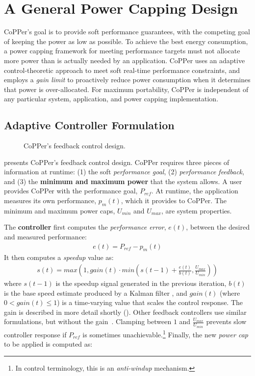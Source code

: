 \section{A General Power Capping Design}
\label{sec:copper-framework}

CoPPer's goal is to provide soft performance guarantees, with the competing goal of keeping the power as low as possible.
To achieve the best energy consumption, a power capping framework for meeting performance targets must not allocate more power than is actually needed by an application.
CoPPer uses an adaptive control-theoretic approach to meet soft real-time performance constraints, and employs a \emph{gain limit} to proactively reduce power consumption when it determines that power is over-allocated.
For maximum portability, CoPPer is independent of any particular system, application, and power capping implementation.


\subsection{Adaptive Controller Formulation}

\begin{figure}[t]
  \centering
  
  \caption{CoPPer's feedback control design.}
  \label{fig:copper-runtime}
\end{figure}

 presents CoPPer's feedback control design.
CoPPer requires three pieces of information at runtime: (1) the soft \emph{performance goal}, (2) \emph{performance feedback}, and (3) the \textbf{minimum and maximum power} that the system allows.
A user provides CoPPer with the performance goal, $P_{ref}$.
At runtime, the application measures its own performance, $p_m(t)$, which it provides to CoPPer.
The minimum and maximum power caps, $U_{min}$ and $U_{max}$, are system properties.

The \textbf{controller} first computes the \emph{performance error}, $e(t)$, between the desired and measured performance:
\begin{eqnarray}
  e(t) = P_{ref} - p_m(t)
  \label{eqn:copper-error}
\end{eqnarray}
It then computes a \emph{speedup} value as:
\begin{eqnarray}
  s(t) = max\left(1, gain(t) \cdot min\left(s(t-1) + \frac{e(t)}{b(t)}, \frac{U_{max}}{U_{min}}\right)\right)
  \label{eqn:copper-speedup-control}
\end{eqnarray}
where $s(t-1)$ is the speedup signal generated in the previous iteration, $b(t)$ is the base speed estimate produced by a Kalman filter \cite{welch2006kalman}, and $gain(t)$ (where $0 < gain(t) \le 1$) is a time-varying value that scales the control response.
The gain is described in more detail shortly ().
Other feedback controllers use similar formulations, but without the gain~\cite{Bard,POET}.
Clamping between $1$ and $\frac{U_{max}}{U_{min}}$ prevents slow controller response if $P_{ref}$ is sometimes unachievable.\footnote{In control terminology, this is an \emph{anti-windup} mechanism.}
Finally, the new \emph{power cap} to be applied is computed as:

